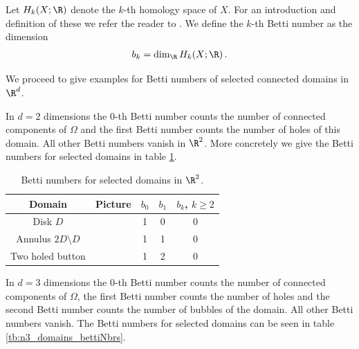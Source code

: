 Let $H_k(X;\R)$ denote the $k$-th homology space of $X$.
For an introduction and definition of these we refer the reader to \cite[Chapter 2]{Hatcher2002}.
We define the $k$-th Betti number as the dimension
\begin{align}
  b_k=\dim_\R H_k(X;\R)\,.\label{eq:df_bettiNbrs}
\end{align}

We proceed to give examples for Betti numbers of selected connected domains in $\R^d$.
\begin{example}[In flatland]
  In $d=2$ dimensions the $0$-th Betti number counts the number of connected components
  of $\Omega$ and the first Betti number counts the number of holes of this domain.
  All other Betti numbers vanish in $\R^2$.
  More concretely we give the Betti numbers for selected domains in table \ref{tb:n2_domains_bettiNbrs}.
\end{example}

\begin{table}
  \centering
  \renewcommand{\arraystretch}{3}
  \begin{tabular}{c|c|c|c|c}
    Domain & Picture & $b_0$ & $b_1$ & $b_k$, $k\geq2$ \\ \hline
    Disk $D$ & 
    \begin{minipage}{0.1\textwidth}
      \def\svgwidth{\textwidth}
      
    \end{minipage}
    & 1 & 0 & 0 \\
    Annulus $2D\setminus D$ & 
    \begin{minipage}{0.1\textwidth}
      \def\svgwidth{\textwidth}
      
    \end{minipage}
    & 1 & 1 & 0 \\
    Two holed button & 
    \begin{minipage}{0.1\textwidth}
      \def\svgwidth{\textwidth}
      
    \end{minipage}
    & 1 & 2 & 0 \\
  \end{tabular}
  \caption{Betti numbers for selected domains in $\R^2$.}
  \label{tb:n2_domains_bettiNbrs}
\end{table}

\begin{example}[In spaceland]
  In $d=3$ dimensions the $0$-th Betti number counts the number of connected components
  of $\Omega$, the first Betti number counts the number of holes and the second Betti number
  counts the number of bubbles of the domain. All other Betti numbers vanish.
  The Betti numbers for selected domains can be seen in table \ref{tb:n3_domains_bettiNbrs}.
\end{example}

